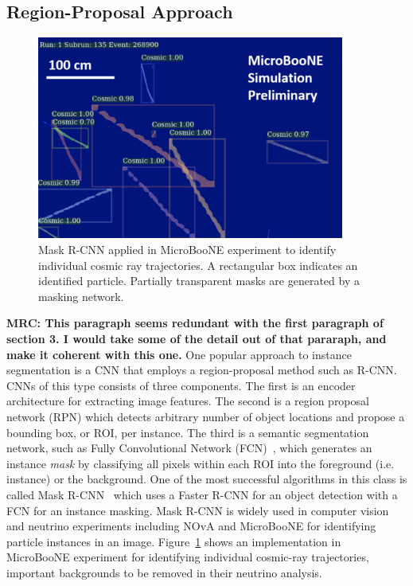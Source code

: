 \documentclass{ws-rv9x6}
\begin{document}
\subsection{Region-Proposal Approach}
\begin{figure}[t]
    \centering
    \includegraphics[width=0.9\textwidth]{figures/uboone_maskrcnn.pdf}
    \caption{Mask R-CNN applied in MicroBooNE experiment to identify individual cosmic ray trajectories. A rectangular box indicates an identified particle. Partially transparent masks are generated by a masking network.}
    \label{fig:clustering:uboone_maskrcnn}
\end{figure}
{\bf MRC: This paragraph seems redundant with the first paragraph of section 3. I would take some of the detail out of that pararaph, and make it coherent with this one.}
One popular approach to instance segmentation is a CNN that employs a region-proposal method such as R-CNN. CNNs of this type consists of three components. The first is an encoder architecture for extracting image features. The second is a region proposal network (RPN) which detects arbitrary number of object locations and propose a bounding box, or ROI, per instance. The third is a semantic segmentation network, such as Fully Convolutional Network (FCN)~\cite{long2014fully}, which generates an instance {\it mask} by classifying all pixels within each ROI into the foreground (i.e. instance) or the background. One of the most successful algorithms in this class is called Mask R-CNN~\cite{8237584} which uses a Faster R-CNN for an object detection with a FCN for an instance masking.  Mask R-CNN is widely used in computer vision and neutrino experiments including NOvA and MicroBooNE for identifying particle instances in an image.  Figure~\ref{fig:clustering:uboone_maskrcnn} shows an implementation in MicroBooNE experiment for identifying individual cosmic-ray trajectories, important backgrounds to be removed in their neutrino analysis.
\end{document}
